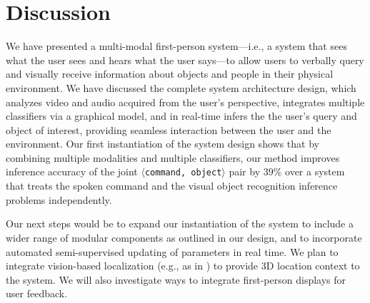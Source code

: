 \documentclass{llncs}
\begin{document}
\section{Discussion}
We have presented a multi-modal first-person system---i.e., a system
that sees what the user sees and hears what the user says---to allow
users to verbally query and visually receive information about objects
and people in their physical environment. We have discussed the
complete system architecture design, which analyzes video and audio
acquired from the user's perspective, integrates multiple classifiers
via a graphical model, and in real-time infers the the user's query
and object of interest, providing seamless interaction between the
user and the environment. Our first instantiation of the system design
shows that by combining multiple modalities and multiple classifiers,
our method improves inference accuracy of the joint
$\langle$\texttt{command, object}$\rangle$ pair by $39\%$ over a
system that treats the spoken command and the visual object
recognition inference problems independently.

Our next steps would be to expand our instantiation of the system to
include a wider range of modular components as outlined in our design,
and to incorporate automated semi-supervised updating of parameters in
real time. We plan to integrate vision-based localization (e.g., as in
\citep{Park12}) to provide 3D location context to the system. We will
also investigate ways to integrate first-person displays for user feedback.

%

%
%
\footnotesize


\end{document}
